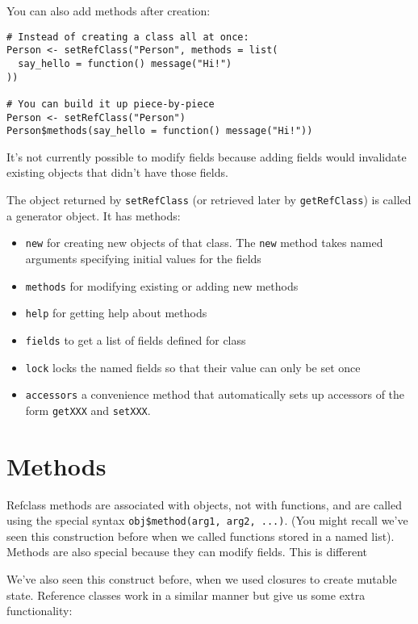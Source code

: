 You can also add methods after creation:

\begin{verbatim}
# Instead of creating a class all at once:
Person <- setRefClass("Person", methods = list(
  say_hello = function() message("Hi!")
))

# You can build it up piece-by-piece
Person <- setRefClass("Person")
Person$methods(say_hello = function() message("Hi!"))
\end{verbatim}

It's not currently possible to modify fields because adding fields would
invalidate existing objects that didn't have those fields.

The object returned by \texttt{setRefClass} (or retrieved later by
\texttt{getRefClass}) is called a generator object. It has methods:

\begin{itemize}
\item
  \texttt{new} for creating new objects of that class. The \texttt{new}
  method takes named arguments specifying initial values for the fields
\item
  \texttt{methods} for modifying existing or adding new methods
\item
  \texttt{help} for getting help about methods
\item
  \texttt{fields} to get a list of fields defined for class
\item
  \texttt{lock} locks the named fields so that their value can only be
  set once
\item
  \texttt{accessors} a convenience method that automatically sets up
  accessors of the form \texttt{getXXX} and \texttt{setXXX}.
\end{itemize}

\hypertarget{methods}{%
\section{Methods}\label{methods}}

Refclass methods are associated with objects, not with functions, and
are called using the special syntax
\texttt{obj\$method(arg1,\ arg2,\ ...)}. (You might recall we've seen
this construction before when we called functions stored in a named
list). Methods are also special because they can modify fields. This is
different

We've also seen this construct before, when we used closures to create
mutable state. Reference classes work in a similar manner but give us
some extra functionality:

